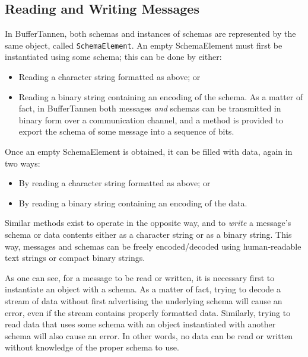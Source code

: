\subsection{Reading and Writing Messages}

In BufferTannen, both schemas and instances of schemas are represented by the same object, called \verb+SchemaElement+. An empty SchemaElement must first be instantiated using some schema; this can be done by either:

\begin{itemize}
\item Reading a character string formatted as above; or

\item Reading a binary string containing an encoding of the schema. As a matter of fact, in BufferTannen both messages \emph{and} schemas can be transmitted in binary form over a communication channel, and a method is provided to export the schema of some message into a sequence of bits.
\end{itemize}

Once an empty SchemaElement is obtained, it can be filled with data, again in two ways:

\begin{itemize}
\item By reading a character string formatted as above; or

\item By reading a binary string containing an encoding of the data.
\end{itemize}

Similar methods exist to operate in the opposite way, and to \emph{write} a message's schema or data contents either as a character string or as a binary string. This way, messages and schemas can be freely encoded/decoded using human-readable text strings or compact binary strings.

As one can see, for a message to be read or written, it is necessary first to instantiate an object with a schema. As a matter of fact, trying to decode a stream of data without first advertising the underlying schema will cause an error, even if the stream contains properly formatted data. Similarly, trying to read data that uses some schema with an object instantiated with another schema will also cause an error. In other words, no data can be read or written without knowledge of the proper schema to use.

